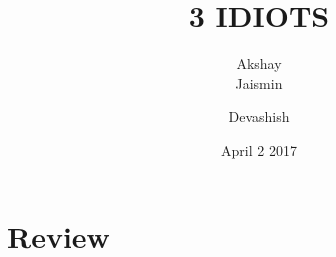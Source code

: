 \documentclass{article}
\title{3 IDIOTS}
\author{Akshay\\Jaismin}
\author{Devashish}
\date{April 2 2017}
\begin{document}
\maketitle
\section{Review}
\end{document}
